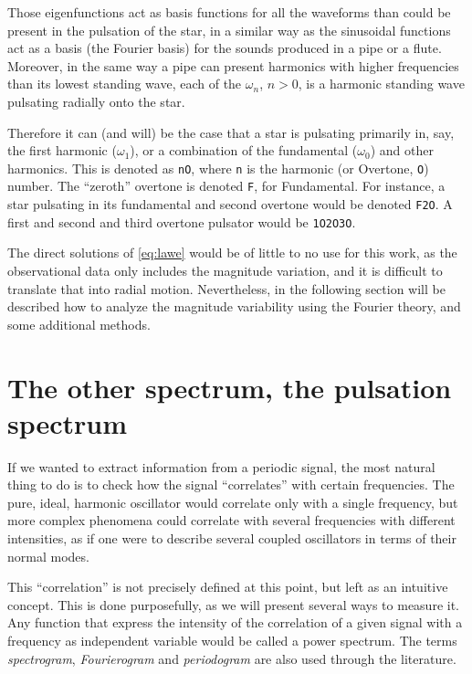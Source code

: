 	Those eigenfunctions act as basis functions for all the waveforms than could be present in the pulsation of the star,
	in a similar way as the sinusoidal functions act as a basis (the Fourier basis) for the sounds produced in a pipe or a flute.
	Moreover, in the same way a pipe can present harmonics with higher frequencies than its lowest standing wave, 
	each of the $\omega_n$, $n>0$, is a harmonic standing wave pulsating radially onto the star.
	
	Therefore it can (and will) be the case that a star is pulsating primarily in, say, the first harmonic ($\omega_1$), 
	or a combination of the fundamental ($\omega_0$) and other harmonics.
	This is denoted as \texttt{nO}, where \texttt{n} is the harmonic (or Overtone, \texttt{O}) number. The \enquote{zeroth} overtone is denoted \texttt{F}, for Fundamental.
	For instance, a star pulsating in its fundamental and second overtone would be denoted \texttt{F2O}. A first and second and third overtone pulsator would be \texttt{1O2O3O}.
	
	The direct solutions of \autoref{eq:lawe} would be of little to no use for this work, 
	as the observational data only includes the magnitude variation, 
	and it is difficult to translate that into radial motion.
	Nevertheless, in the following section will be described how to analyze the magnitude variability using the Fourier theory, and some additional methods.
	
	
\section{The other spectrum, the pulsation spectrum}

If we wanted to extract information from a periodic signal, 
the most natural thing to do is to check how the signal \enquote{correlates} with certain frequencies.
The pure, ideal, harmonic oscillator would correlate only with a single frequency,
but more complex phenomena could correlate with several frequencies with different intensities,
as if one were to describe several coupled oscillators in terms of their normal modes.

This \enquote{correlation} is not precisely defined at this point, but left as an intuitive concept.
This is done purposefully, as we will present several ways to measure it.
Any function that express the intensity of the correlation of a given signal with a frequency as independent variable
would be called a power spectrum. The terms \textit{spectrogram}, \textit{Fourierogram} and \textit{periodogram} are also used through the literature.

